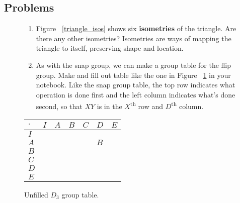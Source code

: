\documentclass[../gatm.tex]{subfiles}
\begin{document}
\subsection{Problems}


\begin{figure}[H]
\begin{minipage}{0.6\textwidth}
\begin{enumerate}
\item Figure ~\ref{triangle_isos} shows six \textbf{isometries} of the triangle. Are there any other isometries? Isometries are ways of mapping the triangle to itself, preserving shape and location.
\item As with the snap group, we can make a group table for the flip group. Make and fill out table like the one in Figure ~\ref{sbstable} in your notebook. Like the snap group table, the top row indicates what operation is done first and the left column indicates what's done second, so that $XY$ is in the $X$\textsuperscript{th} row and $D$\textsuperscript{th} column.
\setcounter{enumLast}{\theenumi}
\end{enumerate}
\end{minipage}\hfill%
\begin{minipage}{0.35\textwidth}\centering
\begin{tabular}{C|C|C|C|C|C|C|}
$\cdot$ & $I$ & $A$ & $B$ & $C$ & $D$ & $E$ \\ \hline
$I$    &   &   &   &   &   &   \\ \hline
$A$    &   &   &   &   & $B$  &   \\ \hline
$B$    &   &   &   &   &   &   \\ \hline
$C$    &   &   &   &   &   &   \\ \hline
$D$    &   &   &   &   &   &   \\ \hline
$E$    &   &   &   &   &   &   \\ \hline
\end{tabular}
\caption{Unfilled $D_3$ group table.}
\label{sbstable}
\end{minipage}
\end{figure}
%
\end{document}

